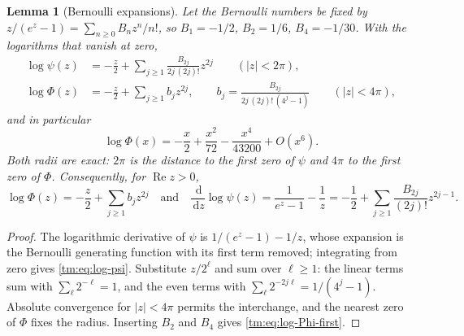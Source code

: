 \documentclass[11pt,a4paper,oneside,openany]{book}
\numberwithin{equation}{chapter}
\newtheorem{lemma}[theorem]{Lemma}
\theoremstyle{definition}
\theoremstyle{remark}
\newcommand{\dd}{\,\mathrm d}
\DeclareMathOperator{\Rea}{Re}
\begin{document}
\begin{lemma}[Bernoulli expansions]\label{tm:lem:bernoulli}
Let the Bernoulli numbers be fixed by $z/(e^z-1)=\sum_{n\ge0}B_nz^n/n!$, so
$B_1=-1/2$, $B_2=1/6$, $B_4=-1/30$. With the logarithms that vanish at zero,
\begin{align}
 \log\psi(z)&=-\frac z2+\sum_{j\ge1}\frac{B_{2j}}{2j\,(2j)!}z^{2j}
 \qquad(|z|<2\pi),\label{tm:eq:log-psi}\\
 \log\Phi(z)&=-\frac z2+\sum_{j\ge1}b_jz^{2j},\qquad
 b_j=\frac{B_{2j}}{2j\,(2j)!\,(4^j-1)}\qquad(|z|<4\pi),
 \label{tm:eq:log-Phi}
\end{align}
and in particular
\begin{equation}\label{tm:eq:log-Phi-first}
 \log\Phi(x)=-\frac x2+\frac{x^2}{72}-\frac{x^4}{43200}+O(x^6).
\end{equation}
Both radii are exact: $2\pi$ is the distance to the first zero of $\psi$ and
$4\pi$ to the first zero of $\Phi$. Consequently, for $\Rea z>0$,
\begin{equation}\label{tm:eq:bj}
 \log\Phi(z)=-\frac z2+\sum_{j\ge1}b_jz^{2j}
 \quad\text{and}\quad
 \frac{\dd}{\dd z}\log\psi(z)=\frac1{e^z-1}-\frac1z
 =-\frac12+\sum_{j\ge1}\frac{B_{2j}}{(2j)!}z^{2j-1}.
\end{equation}
\end{lemma}
\begin{proof}
The logarithmic derivative of $\psi$ is $1/(e^z-1)-1/z$, whose expansion is
the Bernoulli generating function with its first term removed; integrating
from zero gives \eqref{tm:eq:log-psi}. Substitute $z/2^\ell$ and sum over
$\ell\ge1$: the linear terms sum with $\sum_\ell2^{-\ell}=1$, and the even
terms with $\sum_\ell2^{-2j\ell}=1/(4^j-1)$. Absolute convergence for
$|z|<4\pi$ permits the interchange, and the nearest zero of $\Phi$ fixes the
radius. Inserting $B_2$ and $B_4$ gives \eqref{tm:eq:log-Phi-first}.
\end{proof}
\end{document}
